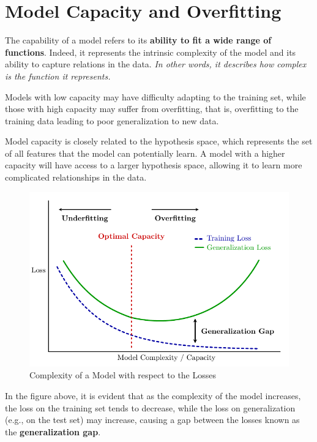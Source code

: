 \section{Model Capacity and Overfitting}

The capability of a model refers to its \textbf{ability to fit a wide range of functions}. Indeed, it represents the intrinsic complexity of the model and its ability to capture relations in the data. \textit{In other words, it describes how complex is the function it represents.}

Models with low capacity may have difficulty adapting to the training set, while those with high capacity may suffer from overfitting, that is, overfitting to the training data leading to poor generalization to new data.

Model capacity is closely related to the hypothesis space, which represents the set of all features that the model can potentially learn. A model with a higher capacity will have access to a larger hypothesis space, allowing it to learn more complicated relationships in the data.

\begin{figure}[!htbp]
    \centering
    \includegraphics[width = \linewidth]{tikz/chapter4 - Model Capacity.pdf}
    \caption{Complexity of a Model with respect to the Losses}
\end{figure}

In the figure above, it is evident that as the complexity of the model increases, the loss on the training set tends to decrease, while the loss on generalization (e.g., on the test set) may increase, causing a gap between the losses known as the \textbf{generalization gap}.

